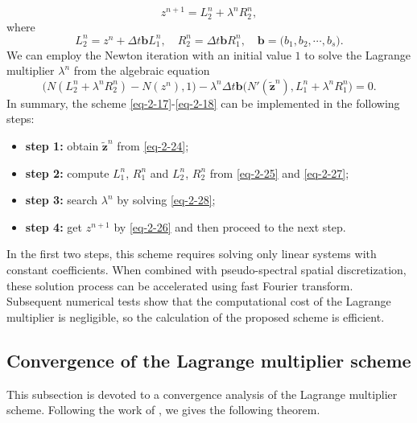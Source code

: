 \documentclass[onefignum,onetabnum]{siamart}
\begin{document}
\begin{equation}\label{eq-2-26}
	z^{n+1}=L_2^n+\lambda^nR_2^n,
\end{equation}
where 
\begin{equation}\label{eq-2-27}
	L_2^n=z^n+\Delta t\textbf{b}L_1^n,\quad R_2^n=\Delta t\textbf{b}R_1^n,\quad \textbf{b}=\big(b_1,b_2,\cdots,b_s\big).
\end{equation}
We can employ the Newton iteration with an initial value $1$ to solve the Lagrange multiplier $\lambda^n$ from the algebraic equation
\begin{equation}\label{eq-2-28}
	\big(N(L_2^n+\lambda^nR_2^n)-N(z^n),1\big)-\lambda^n\Delta t\textbf{b}\big(N'(\tilde{\textbf{z}}^n),L_1^n+\lambda^nR_1^n\big)=0.
\end{equation}
In summary, the scheme \eqref{eq-2-17}-\eqref{eq-2-18} can be implemented in the following steps:
\begin{algorithm}[H]
\begin{itemize}
	\item[{\textbf{$\star$}}]\textbf{step 1:} obtain $\tilde{\textbf{z}}^n$ from \eqref{eq-2-24};
	\item[{\textbf{$\star$}}]\textbf{step 2:} compute $L_1^n$, $R_1^n$ and $L_2^n$, $R_2^n$ from \eqref{eq-2-25} and \eqref{eq-2-27};
	\item[{\textbf{$\star$}}]\textbf{step 3:} search $\lambda^n$ by solving \eqref{eq-2-28};
	\item[{\textbf{$\star$}}]\textbf{step 4:} get $z^{n+1}$ by \eqref{eq-2-26} and then proceed to the next step.
\end{itemize}
\end{algorithm}

In the first two steps, this scheme requires solving only linear systems with constant coefficients. When combined with pseudo-spectral spatial discretization, these solution process can be accelerated using fast Fourier transform. Subsequent numerical tests show that the computational cost of the Lagrange multiplier is negligible, so the calculation of the proposed scheme is efficient.

\subsection{Convergence of the Lagrange multiplier scheme}
This subsection is devoted to a convergence analysis of the Lagrange multiplier scheme. Following the work of \cite{calvo-06-RK-SISC,calvo-10-Lyapunov-BIT}, we gives the following theorem.
\end{document}

